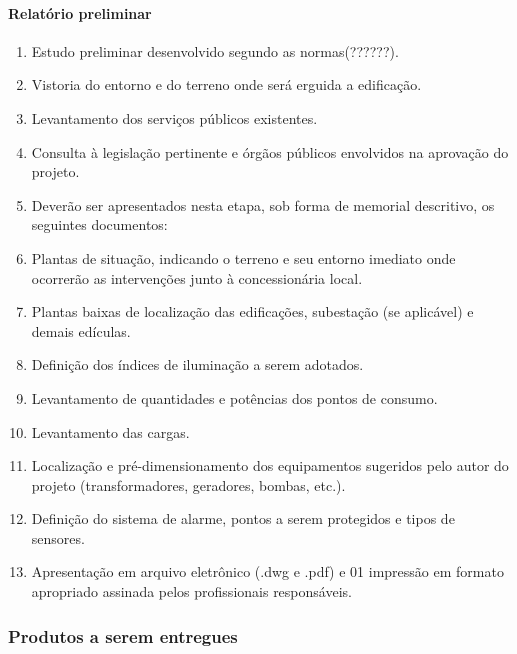 \paragraph{Relatório preliminar}
		\begin{enumerate}
			\item Estudo preliminar desenvolvido segundo as normas(??????).
			
			\item Vistoria do entorno e do terreno onde será erguida a edificação.

			\item Levantamento dos serviços públicos existentes.
			
			\item Consulta à legislação pertinente e órgãos públicos envolvidos na aprovação do projeto.
			
			\item Deverão ser apresentados nesta etapa, sob forma de memorial descritivo, os seguintes documentos:
			
			\item Plantas de situação, indicando o terreno e seu entorno imediato onde ocorrerão as intervenções junto à concessionária local.
			
			\item Plantas baixas de localização das edificações, subestação (se aplicável) e demais edículas.
			
			\item Definição dos índices de iluminação a serem adotados.
			
			\item Levantamento de quantidades e potências dos pontos de consumo.
			
			\item Levantamento das cargas.
			
			\item Localização e pré-dimensionamento dos equipamentos sugeridos pelo autor do projeto (transformadores, geradores, bombas, etc.).
			
			\item Definição do sistema de alarme, pontos a serem protegidos e tipos de sensores.
			
			\item Apresentação em arquivo eletrônico (.dwg e .pdf) e 01 impressão em formato apropriado assinada pelos profissionais responsáveis.
		\end{enumerate}

\subsubsection{Produtos a serem entregues}

